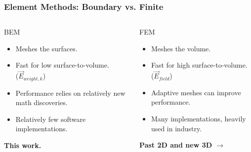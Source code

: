 \documentclass[xcolor=dvipsnames]{beamer}
\begin{document}
\begin{frame}
  \frametitle{Element Methods: Boundary vs. Finite}
  \begin{columns}
    \begin{column}{0.5\textwidth}
      BEM
      \begin{itemize}
      \item Meshes the surfaces.
      \item Fast for low surface-to-volume.\\($\vec{E}_{weight,k}$)
      \item Performance relies on relatively new math discoveries.
      \item Relatively few software implementations.
      \end{itemize}      
      \textbf{This work.}
    \end{column}
    \begin{column}{0.5\textwidth}
      FEM
      \begin{itemize}
      \item Meshes the volume.
      \item Fast for high surface-to-volume.\\($\vec{E}_{field}$)
      \item Adaptive meshes can improve performance.
      \item Many implementations, heavily used in industry.
      \end{itemize}      
      \textbf{Past 2D and new 3D $\rightarrow$}
    \end{column}
  \end{columns}
\end{frame}
\end{document}
